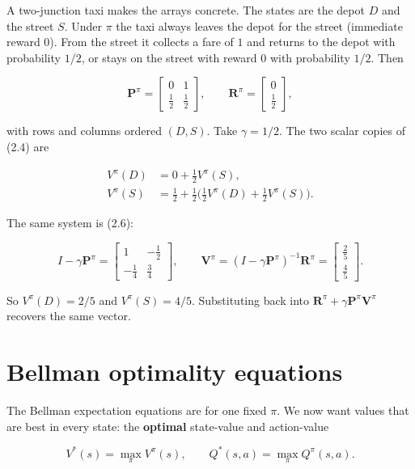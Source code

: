 \begin{asidenote}[Note]
A two-junction taxi makes the arrays concrete. The states are the depot $D$ and the street $S$. Under $\pi$ the taxi always leaves the depot for the street (immediate reward $0$). From the street it collects a fare of $1$ and returns to the depot with probability $1/2$, or stays on the street with reward $0$ with probability $1/2$. Then

\[
\mathbf{P}^\pi
=
\begin{bmatrix}
0 & 1 \\
\tfrac{1}{2} & \tfrac{1}{2}
\end{bmatrix},
\qquad
\mathbf{R}^\pi
=
\begin{bmatrix}
0 \\
\tfrac{1}{2}
\end{bmatrix},
\]

with rows and columns ordered $(D,S)$. Take $\gamma=1/2$. The two scalar copies of (2.4) are

\[
\begin{aligned}
V^\pi(D)
&=
0 + \tfrac{1}{2} V^\pi(S), \\
V^\pi(S)
&=
\tfrac{1}{2} + \tfrac{1}{2}
\bigl(
\tfrac{1}{2} V^\pi(D) + \tfrac{1}{2} V^\pi(S)
\bigr).
\end{aligned}
\]

The same system is (2.6):

\[
I - \gamma \mathbf{P}^\pi
=
\begin{bmatrix}
1 & -\tfrac{1}{2} \\
-\tfrac{1}{4} & \tfrac{3}{4}
\end{bmatrix},
\qquad
\mathbf{V}^\pi
=
(I - \gamma \mathbf{P}^\pi)^{-1} \mathbf{R}^\pi
=
\begin{bmatrix}
\tfrac{2}{5} \\
\tfrac{4}{5}
\end{bmatrix}.
\]

So $V^\pi(D)=2/5$ and $V^\pi(S)=4/5$. Substituting back into $\mathbf{R}^\pi+\gamma\mathbf{P}^\pi\mathbf{V}^\pi$ recovers the same vector.
\end{asidenote}

\section{Bellman optimality equations}
The Bellman expectation equations are for one fixed $\pi$. We now want values that are best in every state: the \textbf{optimal} state-value and action-value

\begin{equation}
V^*(s) = \max_\pi V^\pi(s),
\qquad
Q^*(s,a) = \max_\pi Q^\pi(s,a).
\tag{2.7}
\end{equation}

